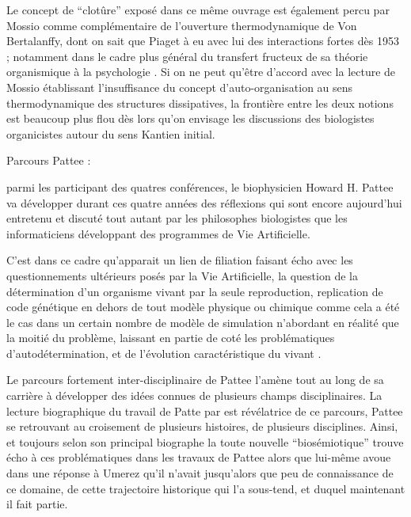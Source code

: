 
Le concept de \enquote{clotûre} exposé dans ce même ouvrage est également percu par Mossio comme complémentaire de l'ouverture thermodynamique de Von Bertalanffy, dont on sait que Piaget à eu avec lui des interactions fortes dès 1953 \autocite[310-311]{Pouvreau2013}; notamment dans le cadre plus général du transfert fructeux de sa théorie organismique à la psychologie \autocite[945-951]{Pouvreau2013}. Si on ne peut qu'être d'accord avec la lecture de Mossio établissant l'insuffisance du concept d'auto-organisation au sens thermodynamique des structures dissipatives, la frontière entre les deux notions est beaucoup plus flou dès lors qu'on envisage les discussions des biologistes organicistes autour du sens Kantien initial. 

Parcours Pattee : 

parmi les participant des quatres conférences, le biophysicien Howard H. Pattee va développer durant ces quatre années des réflexions qui sont encore aujourd'hui entretenu et discuté tout autant par les philosophes biologistes que les informaticiens développant des programmes de Vie Artificielle.

C'est dans ce cadre qu'apparait un lien de filiation faisant écho avec les questionnements ultérieurs posés par la Vie Artificielle, la question de la détermination d'un organisme vivant par la seule reproduction, replication de code génétique en dehors de tout modèle physique ou chimique comme cela a été le cas dans un certain nombre de modèle de simulation n'abordant en réalité que la moitié du problème, laissant en partie de coté les problématiques d'autodétermination, et de l'évolution caractéristique du vivant \autocite{Mossio}.




Le parcours fortement inter-disciplinaire de Pattee l'amène tout au long de sa carrière à développer des idées connues de plusieurs champs disciplinaires.  La lecture biographique du travail de Patte par \textcite{Umerez2001} est révélatrice de ce parcours, Pattee se retrouvant au croisement de plusieurs histoires, de plusieurs disciplines. Ainsi, et toujours selon son principal biographe \autocite{Umerez2009} la toute nouvelle \enquote{biosémiotique} trouve écho à ces problématiques dans les travaux de Pattee alors que lui-même avoue dans une réponse à Umerez \autocite{Pattee2009} qu'il n'avait jusqu'alors que peu de connaissance de ce domaine, de cette trajectoire historique qui l'a sous-tend, et duquel maintenant il fait partie. 

